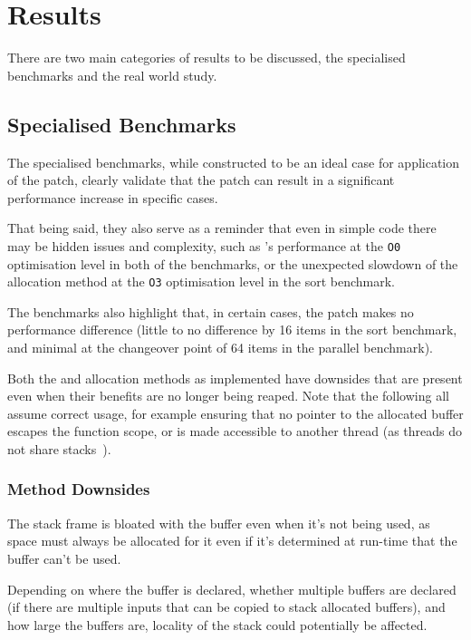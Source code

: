 \section{Results}

There are two main categories of results to be discussed, the specialised benchmarks and the real world study.

\subsection{Specialised Benchmarks}

The specialised benchmarks, while constructed to be an ideal case for application of the patch, clearly validate that the patch can result in a significant performance increase in specific cases. 

That being said, they also serve as a reminder that even in simple code there may be hidden issues and complexity, such as 's performance at the \texttt{O0} optimisation level in both of the benchmarks, or the unexpected slowdown of the  allocation method at the \texttt{O3} optimisation level in the sort benchmark.

The benchmarks also highlight that, in certain cases, the patch makes no performance difference (little to no difference by 16 items in the sort benchmark, and minimal at the changeover point of 64 items in the parallel benchmark).

Both the  and  allocation methods as implemented have downsides that are present even when their benefits are no longer being reaped. Note that the following all assume correct usage, for example ensuring that no pointer to the allocated buffer escapes the function scope, or is made accessible to another thread (as threads do not share stacks~\cite{threadstack}).

\subsubsection{ Method Downsides}

The stack frame is bloated with the buffer even when it's not being used, as space must always be allocated for it even if it's determined at run-time that the buffer can't be used.

Depending on where the buffer is declared, whether multiple buffers are declared (if there are multiple inputs that can be copied to stack allocated buffers), and how large the buffers are, locality of the stack could potentially be affected.

